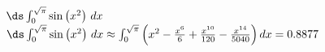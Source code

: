 {$\ds \int_0^{\sqrt{\pi}} \sin \big(x^2\big)\ dx$
}
{$\ds \int_0^{\sqrt{\pi}} \sin \big(x^2\big)\ dx \approx \int_0^{\sqrt{\pi}} \left(x^2-\frac{x^6}6+\frac{x^{10}}{120}-\frac{x^{14}}{5040}\right) dx = 0.8877$
}